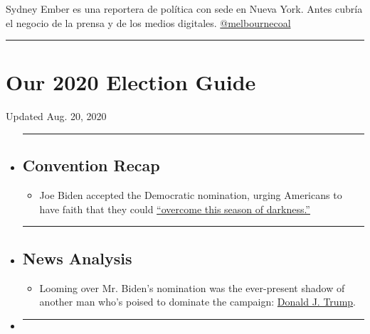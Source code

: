 Sydney Ember es una reportera de política con sede en Nueva York. Antes
cubría el negocio de la prensa y de los medios digitales.
\href{https://twitter.com/melbournecoal}{@melbournecoal}

\begin{center}\rule{0.5\linewidth}{\linethickness}\end{center}

\hypertarget{our-2020-election-guide}{%
\section{Our 2020 Election Guide}\label{our-2020-election-guide}}

Updated Aug. 20, 2020

\begin{itemize}
\item
  \begin{center}\rule{0.5\linewidth}{\linethickness}\end{center}

  \hypertarget{convention-recap}{%
  \subsection{Convention Recap}\label{convention-recap}}

  \begin{itemize}
  \tightlist
  \item
    Joe Biden accepted the Democratic nomination, urging Americans to
    have faith that they could
    \href{https://www.nytimes3xbfgragh.onion/2020/08/20/us/politics/Joe-Biden-accepts-democratic-nomination.html?action=click\&pgtype=Article\&state=default\&region=BELOW_MAIN_CONTENT\&context=storylines_guide}{``overcome
    this season of darkness.''}
  \end{itemize}
\item
  \begin{center}\rule{0.5\linewidth}{\linethickness}\end{center}

  \hypertarget{news-analysis}{%
  \subsection{News Analysis}\label{news-analysis}}

  \begin{itemize}
  \tightlist
  \item
    Looming over Mr. Biden's nomination was the ever-present shadow of
    another man who's poised to dominate the campaign:
    \href{https://www.nytimes3xbfgragh.onion/2020/08/20/us/politics/biden-dnc-speech-trump.html?action=click\&pgtype=Article\&state=default\&region=BELOW_MAIN_CONTENT\&context=storylines_guide}{Donald
    J. Trump}.
  \end{itemize}
\item
  \begin{center}\rule{0.5\linewidth}{\linethickness}\end{center}


\end{itemize}
